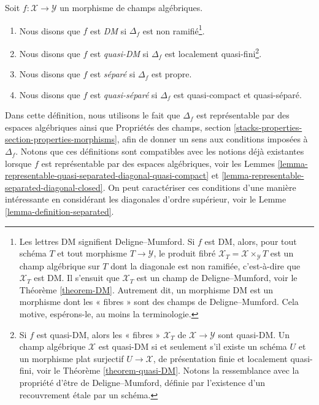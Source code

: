 \begin{definition}
\label{definition-separated}
Soit $f:\mathcal{X}\to\mathcal{Y}$ un morphisme de champs algébriques.
\begin{enumerate}
\item Nous disons que $f$ est {\it DM} si $\Delta_f$ est non
ramifié\footnote{Les lettres DM signifient Deligne--Mumford. Si $f$ est DM,
alors, pour tout schéma $T$ et tout morphisme $T\to\mathcal{Y}$, le produit fibré
$\mathcal{X}_T = \mathcal{X} \times_\mathcal{Y} T$
est un champ algébrique sur $T$ dont la diagonale est non ramifiée,
c'est-à-dire que $\mathcal{X}_T$ est DM. Il s'ensuit que $\mathcal{X}_T$ est
un champ de Deligne--Mumford, voir le Théorème \ref{theorem-DM}. Autrement dit,
un morphisme DM est un morphisme dont les « fibres » sont des champs de
Deligne--Mumford. Cela motive, espérons-le, au moins la terminologie.}.
\item Nous disons que $f$ est {\it quasi-DM} si $\Delta_f$ est localement
quasi-fini\footnote{Si $f$ est quasi-DM, alors les « fibres »
$\mathcal{X}_T$ de $\mathcal{X}\to\mathcal{Y}$ sont quasi-DM. Un champ
algébrique $\mathcal{X}$ est quasi-DM si et seulement s'il existe un schéma
$U$ et un morphisme plat surjectif $U\to\mathcal{X}$, de présentation finie
et localement quasi-fini, voir le Théorème \ref{theorem-quasi-DM}. Notons la
ressemblance avec la propriété d'être de Deligne--Mumford, définie par
l'existence d'un recouvrement étale par un schéma.}.
\item Nous disons que $f$ est {\it séparé} si $\Delta_f$ est propre.
\item Nous disons que $f$ est {\it quasi-séparé} si $\Delta_f$ est
quasi-compact et quasi-séparé.
\end{enumerate}
\end{definition}

\noindent
Dans cette définition, nous utilisons le fait que $\Delta_f$ est représentable
par des espaces algébriques ainsi que Propriétés des champs,
section \ref{stacks-properties-section-properties-morphisms}, afin de donner
un sens aux conditions imposées à $\Delta_f$. Notons que ces définitions sont
compatibles avec les notions déjà existantes lorsque $f$ est représentable par
des espaces algébriques, voir les Lemmes
\ref{lemma-representable-quasi-separated-diagonal-quasi-compact} et
\ref{lemma-representable-separated-diagonal-closed}. On peut caractériser ces
conditions d'une manière intéressante en considérant les diagonales d'ordre
supérieur, voir le Lemme \ref{lemma-definition-separated}.

